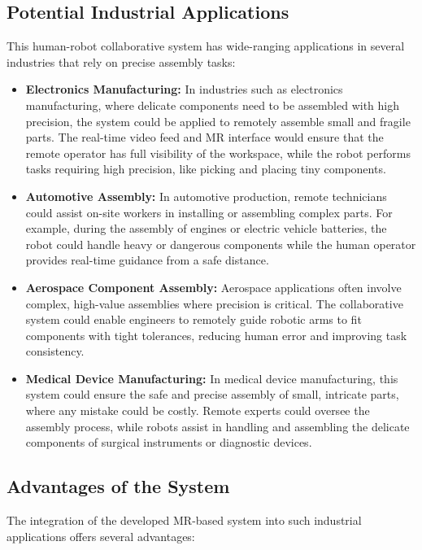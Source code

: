     \subsection{Potential Industrial Applications}
    
    This human-robot collaborative system has wide-ranging applications in several industries that rely on precise assembly tasks:
    
    \begin{itemize}
        \item \textbf{Electronics Manufacturing:} In industries such as electronics manufacturing, where delicate components need to be assembled with high precision, the system could be applied to remotely assemble small and fragile parts. The real-time video feed and \ac{MR} interface would ensure that the remote operator has full visibility of the workspace, while the robot performs tasks requiring high precision, like picking and placing tiny components.
    
        \item \textbf{Automotive Assembly:} In automotive production, remote technicians could assist on-site workers in installing or assembling complex parts. For example, during the assembly of engines or electric vehicle batteries, the robot could handle heavy or dangerous components while the human operator provides real-time guidance from a safe distance.
    
        \item \textbf{Aerospace Component Assembly:} Aerospace applications often involve complex, high-value assemblies where precision is critical. The collaborative system could enable engineers to remotely guide robotic arms to fit components with tight tolerances, reducing human error and improving task consistency.
    
        \item \textbf{Medical Device Manufacturing:} In medical device manufacturing, this system could ensure the safe and precise assembly of small, intricate parts, where any mistake could be costly. Remote experts could oversee the assembly process, while robots assist in handling and assembling the delicate components of surgical instruments or diagnostic devices.
    
    \end{itemize}
    
    \subsection{Advantages of the System}
    The integration of the developed \ac{MR}-based system into such industrial applications offers several advantages:
    
